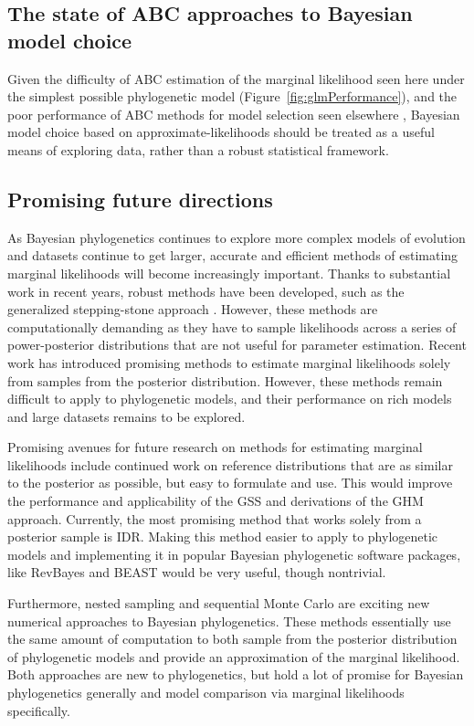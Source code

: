 \subsection{The state of ABC approaches to Bayesian model choice}

Given the difficulty of ABC estimation of the marginal likelihood seen here
under the simplest possible phylogenetic model
(Figure~\ref{fig:glmPerformance}), and the poor performance of ABC methods for
model selection seen elsewhere \citep{Robert2011,Oaks2012,Oaks2014reply},
Bayesian model choice based on approximate-likelihoods should be treated as a
useful means of exploring data, rather than a robust statistical framework.


\subsection{Promising future directions}

As Bayesian phylogenetics continues to explore more complex models of evolution
and datasets continue to get larger, accurate and efficient methods of
estimating marginal likelihoods will become increasingly important.
Thanks to substantial work in recent years, robust methods have been developed,
such as the generalized stepping-stone approach \citep{Fan2011}.
However, these methods are computationally demanding as they have to sample
likelihoods across a series of power-posterior distributions that are not
useful for parameter estimation.
Recent work has introduced promising methods to estimate marginal likelihoods
solely from samples from the posterior distribution.
However, these methods remain difficult to apply to phylogenetic models, and
their performance on rich models and large datasets remains to be explored.

Promising avenues for future research on methods for estimating marginal
likelihoods include continued work on reference distributions that are as
similar to the posterior as possible, but easy to formulate and use.
This would improve the performance and applicability of the GSS and derivations
of the GHM approach.
Currently, the most promising method that works solely from a posterior
sample is IDR.
Making this method easier to apply to phylogenetic models and implementing
it in popular Bayesian phylogenetic software packages,
like
RevBayes \citep{Hohna2016}
and
BEAST \citep{Drummond2012,Bouckaert2014}
would be very useful, though nontrivial.

Furthermore, nested sampling and sequential Monte Carlo are exciting new
numerical approaches to Bayesian phylogenetics.
These methods essentially use the same amount of computation to both sample
from the posterior distribution of phylogenetic models and provide an
approximation of the marginal likelihood.
Both approaches are new to phylogenetics, but hold a lot of promise
for Bayesian phylogenetics generally and model comparison via
marginal likelihoods specifically.



